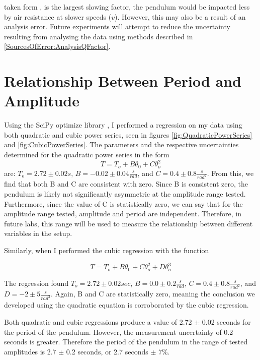 \documentclass[11pt]{article}
\begin{document}
            taken form \cite{nasa_2015}, is the largest slowing factor, the pendulum would be impacted less by air resistance at slower speeds ($v$). However, this may also be a result of an analysis error. Future experiments will attempt to reduce the uncertainty resulting from analysing the data using methods described in \ref{SourcesOfError:AnalysisQFactor}.

    \section{Relationship Between Period and Amplitude}\label{PeriodVsAmp}
        Using the SciPy optimize library \cite{2020SciPy-NMeth}, I performed a regression on my data using both quadratic and cubic power series, seen in figures \ref{fig:QuadraticPowerSeries} and \ref{fig:CubicPowerSeries}. The parameters and the respective uncertainties determined for the quadratic power series in the form 
        \begin{equation}
            T = T_{o} + B\theta_{0} + C\theta_{o}^{2}
        \end{equation}
        \cite{labManual} are: $T_o = 2.72 \pm 0.02 s$, $B = -0.02 \pm 0.04 \frac{s}{rad}$, and $C = 0.4 \pm 0.8 \frac{s}{rad^2}$. From this, we find that both B and C are consistent with zero. Since B is consistent zero, the pendulum is likely not significantly asymmetric at the amplitude range tested. Furthermore, since the value of C is statistically zero, we can say that for the amplitude range tested, amplitude and period are independent. Therefore, in future labs, this range will be used to measure the relationship between different variables in the setup. 
        
        Similarly, when I performed the cubic regression with the function 
        
        \begin{equation}
            T = T_{o} + B\theta_{0} + C\theta_{o}^{2} + D\theta_{o}^3
            \label{eq:PeriodVsAmp}
        \end{equation}
        
        The regression found $T_o = 2.72 \pm 0.02 sec$, $B = 0.0 \pm 0.2 \frac{s}{rad}$,  $C = 0.4 \pm 0.8 \frac{s}{rad^2}$, and $D = -2 \pm 5 \frac{s}{rad^3}$. Again, B and C are statistically zero, meaning the conclusion we developed using the quadratic equation is corroborated by the cubic regression.

        Both quadratic and cubic regressions produce a value of 2.72 $\pm$ 0.02 seconds for the period of the pendulum. However, the measurement uncertainty of 0.2 seconds is greater. Therefore the period of the pendulum in the range of tested amplitudes is 2.7 $\pm$ 0.2 seconds, or 2.7 seconds $\pm$ 7\%.
\end{document}
